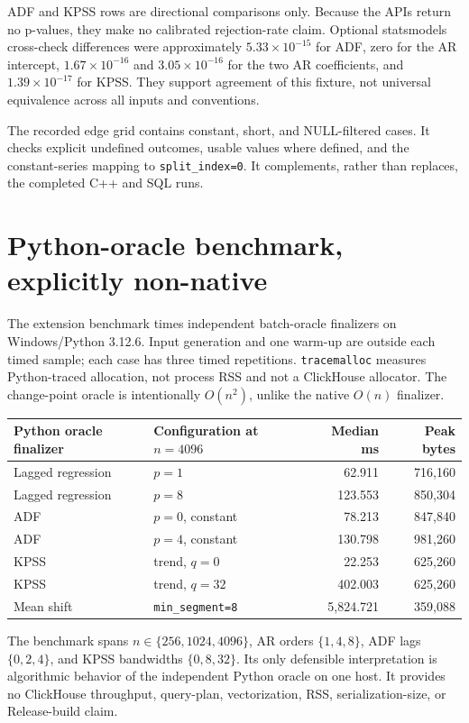\documentclass[11pt]{article}
\begin{document}
ADF and KPSS rows are directional comparisons only. Because the APIs return no p-values, they make no calibrated rejection-rate claim. Optional statsmodels cross-check differences were approximately $5.33\times10^{-15}$ for ADF, zero for the AR intercept, $1.67\times10^{-16}$ and $3.05\times10^{-16}$ for the two AR coefficients, and $1.39\times10^{-17}$ for KPSS. They support agreement of this fixture, not universal equivalence across all inputs and conventions.

The recorded edge grid contains constant, short, and NULL-filtered cases. It checks explicit undefined outcomes, usable values where defined, and the constant-series mapping to \texttt{split\_index=0}. It complements, rather than replaces, the completed C++ and SQL runs.

\section{Python-oracle benchmark, explicitly non-native}

The extension benchmark times independent batch-oracle finalizers on Windows/Python 3.12.6. Input generation and one warm-up are outside each timed sample; each case has three timed repetitions. \texttt{tracemalloc} measures Python-traced allocation, not process RSS and not a ClickHouse allocator. The change-point oracle is intentionally $O(n^2)$, unlike the native $O(n)$ finalizer.

\noindent\begin{tabularx}{\textwidth}{@{}Ylrr@{}}
\toprule
Python oracle finalizer & Configuration at $n=4096$ & Median ms & Peak bytes \\
\midrule
Lagged regression & $p=1$ & 62.911 & 716,160 \\
Lagged regression & $p=8$ & 123.553 & 850,304 \\
ADF & $p=0$, constant & 78.213 & 847,840 \\
ADF & $p=4$, constant & 130.798 & 981,260 \\
KPSS & trend, $q=0$ & 22.253 & 625,260 \\
KPSS & trend, $q=32$ & 402.003 & 625,260 \\
Mean shift & \texttt{min\_segment=8} & 5,824.721 & 359,088 \\
\bottomrule
\end{tabularx}

The benchmark spans $n\in\{256,1024,4096\}$, AR orders $\{1,4,8\}$, ADF lags $\{0,2,4\}$, and KPSS bandwidths $\{0,8,32\}$. Its only defensible interpretation is algorithmic behavior of the independent Python oracle on one host. It provides no ClickHouse throughput, query-plan, vectorization, RSS, serialization-size, or Release-build claim.
\end{document}
